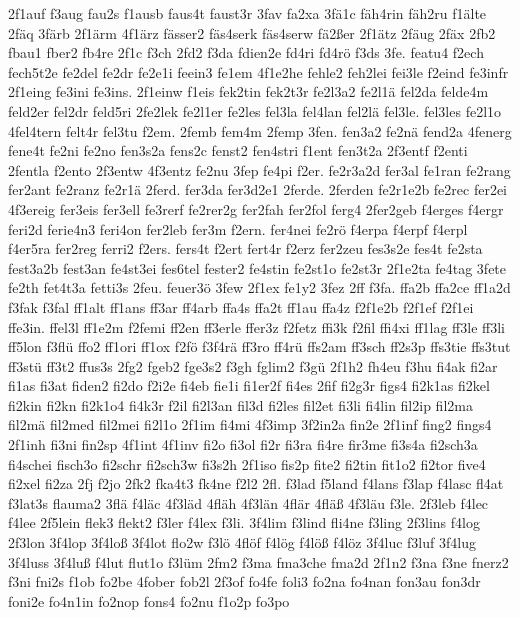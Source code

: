 {2f1auf
f3aug
fau2s
f1ausb
faus4t
faust3r
3fav
fa2xa
3fä1c
fäh4rin
fäh2ru
f1älte
2fäq
3färb
2f1ärm
4f1ärz
fässer2
fäs4serk
fäs4serw
fä2ßer
2f1ätz
2fäug
2fäx
2fb2
fbau1
fber2
fb4re
2f1c
f3ch
2fd2
f3da
fdien2e
fd4ri
fd4rö
f3ds
3fe.
featu4
f2ech
fech5t2e
fe2del
fe2dr
fe2e1i
feein3
fe1em
4f1e2he
fehle2
feh2lei
fei3le
f2eind
fe3infr
2f1eing
fe3ini
fe3ins.
2f1einw
f1eis
fek2tin
fek2t3r
fe2l3a2
fe2l1ä
fel2da
felde4m
feld2er
fel2dr
feld5ri
2fe2lek
fe2l1er
fe2les
fel3la
fel4lan
fel2lä
fel3le.
fel3les
fe2l1o
4fel4tern
felt4r
fel3tu
f2em.
2femb
fem4m
2femp
3fen.
fen3a2
fe2nä
fend2a
4fenerg
fene4t
fe2ni
fe2no
fen3s2a
fens2c
fenst2
fen4stri
f1ent
fen3t2a
2f3entf
f2enti
2fentla
f2ento
2f3entw
4f3entz
fe2nu
3fep
fe4pi
f2er.
fe2r3a2d
fer3al
fe1ran
fe2rang
fer2ant
fe2ranz
fe2r1ä
2ferd.
fer3da
fer3d2e1
2ferde.
2ferden
fe2r1e2b
fe2rec
fer2ei
4f3ereig
fer3eis
fer3ell
fe3rerf
fe2rer2g
fer2fah
fer2fol
ferg4
2fer2geb
f4erges
f4ergr
feri2d
ferie4n3
feri4on
fer2leb
fer3m
f2ern.
fer4nei
fe2rö
f4erpa
f4erpf
f4erpl
f4er5ra
fer2reg
ferri2
f2ers.
fers4t
f2ert
fert4r
f2erz
fer2zeu
fes3s2e
fes4t
fe2sta
fest3a2b
fest3an
fe4st3ei
fes6tel
fester2
fe4stin
fe2st1o
fe2st3r
2f1e2ta
fe4tag
3fete
fe2th
fet4t3a
fetti3s
2feu.
feuer3ö
3few
2f1ex
fe1y2
3fez
2ff
f3fa.
ffa2b
ffa2ce
ff1a2d
f3fak
f3fal
ff1alt
ff1ans
ff3ar
ff4arb
ffa4s
ffa2t
ff1au
ffa4z
f2f1e2b
f2f1ef
f2f1ei
ffe3in.
ffel3l
ff1e2m
f2femi
ff2en
ff3erle
ffer3z
f2fetz
ffi3k
f2fil
ffi4xi
ff1lag
ff3le
ff3li
ff5lon
f3flü
ffo2
ff1ori
ff1ox
f2fö
f3f4rä
ff3ro
ff4rü
ffs2am
ff3sch
ff2s3p
ffs3tie
ffs3tut
ff3stü
ff3t2
ffus3s
2fg2
fgeb2
fge3s2
f3gh
fglim2
f3gü
2f1h2
fh4eu
f3hu
fi4ak
fi2ar
fi1as
fi3at
fiden2
fi2do
f2i2e
fi4eb
fie1i
fi1er2f
fi4es
2fif
fi2g3r
figs4
fi2k1as
fi2kel
fi2kin
fi2kn
fi2k1o4
fi4k3r
f2il
fi2l3an
fil3d
fi2les
fil2et
fi3li
fi4lin
fil2ip
fil2ma
fil2mä
fil2med
fil2mei
fi2l1o
2f1im
fi4mi
4f3imp
3f2in2a
fin2e
2f1inf
fing2
fings4
2f1inh
fi3ni
fin2sp
4f1int
4f1inv
fi2o
fi3ol
fi2r
fi3ra
fi4re
fir3me
fi3s4a
fi2sch3a
fi4schei
fisch3o
fi2schr
fi2sch3w
fi3s2h
2f1iso
fis2p
fite2
fi2tin
fit1o2
fi2tor
five4
fi2xel
fi2za
2fj
f2jo
2fk2
fka4t3
fk4ne
f2l2
2fl.
f3lad
f5land
f4lans
f3lap
f4lasc
fl4at
f3lat3s
flauma2
3flä
f4läc
4f3läd
4fläh
4f3län
4flär
4fläß
4f3läu
f3le.
2f3leb
f4lec
f4lee
2f5lein
flek3
flekt2
f3ler
f4lex
f3li.
3f4lim
f3lind
fli4ne
f3ling
2f3lins
f4log
2f3lon
3f4lop
3f4loß
3f4lot
flo2w
f3lö
4flöf
f4lög
f4löß
f4löz
3f4luc
f3luf
3f4lug
3f4luss
3f4luß
f4lut
flut1o
f3lüm
2fm2
f3ma
fma3che
fma2d
2f1n2
f3na
f3ne
fnerz2
f3ni
fni2s
f1ob
fo2be
4fober
fob2l
2f3of
fo4fe
foli3
fo2na
fo4nan
fon3au
fon3dr
foni2e
fo4n1in
fo2nop
fons4
fo2nu
f1o2p
fo3po
}
